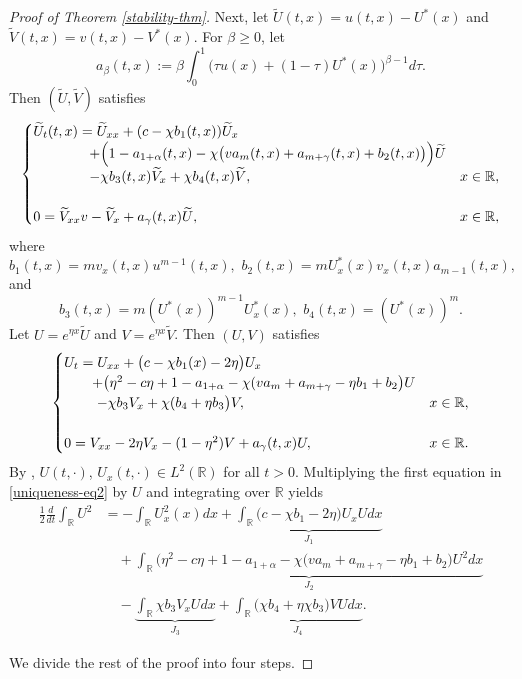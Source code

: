 \documentclass[11pt]{article} %
\theoremstyle{remark}
\theoremstyle{remark}
\numberwithin{equation}{section}
\numberwithin{figure}{section}
\numberwithin{table}{section}
\newcommand\RR{\ensuremath{\mathbb{R}}}
\begin{document}
\begin{proof}[Proof of Theorem \ref{stability-thm}]
\smallskip


Next, let $\widetilde U(t,x)=u(t,x)-U^*(x)$ and $\widetilde V(t,x)=v(t,x)-V^*(x)$. 
For $\beta\ge 0$, let
$$
a_\beta(t,x):=\beta \int_0^1 \big(\tau u(x)+(1-\tau) U^*(x)\big)^{\beta-1}d\tau.
$$
Then $(\widetilde U,\widetilde V)$ satisfies
\begin{equation}
\label{stability-eq1}
\begin{cases}
\widetilde U_t(t,x)=\widetilde U_{xx}+(c- \chi b_1(t,x)) \widetilde  U_x  \cr
\qquad\qquad + \Big(1-a_{1+\alpha} (t,x)-\chi\big (v a_m(t,x)  + a_{m+\gamma}(t,x)
 +b_2(t,x)\big)\Big)\widetilde U\\
\qquad\qquad  - \chi b_3(t,x) \widetilde  V_x + \chi b_4(t,x) \widetilde V,\quad &x\in\mathbb{R},
\cr\cr
0=\widetilde V_{xx}v- \widetilde V_x+  a_\gamma(t,x)  \widetilde U,\quad &x\in\mathbb{R},
\end{cases}
\end{equation}
where 
$$
 b_1(t,x)=  m  v_{x}(t,x) u^{m-1}(t,x),
\,\,
 b_2(t,x)=m U_{x}^*(x) v_{x}(t,x) a_{m-1}(t,x)  ,
$$
and
$$
 b_3(t,x)= m  (U^*(x))^{m-1} U^*_x(x),\,\,
 b_4(t,x)=  (U^*(x))^m.
$$
Let $U=e^{\eta x}\widetilde U$ and $V=e^{\eta x}\widetilde V$.
Then $(U,V)$ satisfies
\begin{equation}
\label{uniqueness-eq2}
\begin{cases}
U_t=U_{xx} +\big(c-\chi b_1(x)-2\eta\big)U_x\cr
\qquad +\big(\eta^2-c\eta+1-a_{1+\alpha} -\chi( v a_m  + a_{m+\gamma}-\eta b_1 + b_2\big) U\cr
\qquad\,\,  -\chi b_3 V_x+\chi (b_4+\eta b_3\big) V,\quad &x\in\mathbb{R}, \cr\cr
0=V_{xx}-2\eta V_x-(1-\eta^2) V +a_\gamma(t,x) U,\quad &x\in\mathbb{R}.
\end{cases}
\end{equation}
By \cite[Theorem 7.1.3]{Hen}, $U(t,\cdot)$, $U_x(t,\cdot)\in L^2(\mathbb{R})$ for all $t>0$.
Multiplying the first equation in \eqref{uniqueness-eq2} by $U$ and integrating over $\RR$ yields
\begin{align*}
\frac{1}{2}\frac{d}{dt}\int_{\RR} U^2&=-\int_{\RR} U_x^2(x)dx+\underbrace{\int_{\RR} \big(c-\chi b_1-2\eta\big)U_xUdx}_{J_1} \\
&\quad +\underbrace{\int_{\RR}\big(\eta^2-c\eta+1-a_{1+\alpha}  -\chi( v a_m + a_{m+\gamma}-\eta b_1+b_2\big) U^2dx}_{J_2}\\
&\quad -\underbrace{\int_{\RR} \chi b_3 V_xUdx}_{J_3}+\underbrace{\int_{\RR}\big(\chi b_4+\eta\chi  b_3\big) V Udx}_{J_4}.
\end{align*}

We divide the rest of the proof into four steps.



\end{proof}
\end{document}

